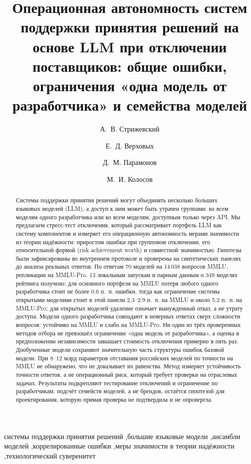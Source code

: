 \documentclass[preprint,12pt,authoryear]{elsarticle}
\begin{document}
\begin{frontmatter}

\title{Операционная автономность систем поддержки принятия решений на основе LLM при отключении поставщиков: общие ошибки, ограничения «одна модель от разработчика» и семейства моделей}

\author[bmstu]{А.~В. Стрижевский}
\author[bmstu]{Е.~Д. Верховых}
\author[bmstu]{Д.~М. Парамонов}
\author[bmstu]{М.~И. Колосов}

\begin{abstract}
Системы поддержки принятия решений могут объединять несколько больших языковых моделей (LLM), а доступ к ним может быть утрачен группами: ко всем моделям одного разработчика или ко всем моделям, доступным только через API. Мы предлагаем стресс-тест отключения, который рассматривает портфель LLM как систему компонентов и измеряет его операционную автономность мерами значимости из теории надёжности: приростом ошибки при групповом отключении, его относительной формой (risk achievement worth) и совместной значимостью. Гипотезы были зафиксированы во внутреннем протоколе и проверены на синтетических панелях до анализа реальных ответов. По ответам 70 моделей на 14\,038 вопросов MMLU, репликации на MMLU-Pro, 13 локальным запускам и парным данным о 349 моделях рейтинга получено: для основного портфеля на MMLU потеря любого одного разработчика стоит не более 0.6 п.~п. ошибки, тогда как ограничение системы открытыми моделями стоит в этой панели 2.3--2.9 п.~п. на MMLU и около 5.2 п.~п. на MMLU-Pro; для открытых моделей удаление означает вынужденный отказ, а не утрату доступа. Модели одного разработчика совпадают в неверных ответах сверх сложности вопросов: устойчиво на MMLU и слабо на MMLU-Pro. Ни один из трёх проверенных методов отбора не превзошёл ограничение «одна модель от разработчика», а оценка в предположении независимости завышает стоимость отключения примерно в пять раз. Дообученные модели сохраняют значительную часть структуры ошибок базовой модели. При 8--12 млрд параметров отставания российских моделей по точности на MMLU не обнаружено, что не доказывает их равенства. Метод измеряет устойчивость точности ответов, а не операционный риск, который требует проверки на отраслевых задачах. Результаты подкрепляют тестирование отключений и ограничение по разработчикам; подсчёт семейств моделей, а не брендов, остаётся гипотезой для проектирования, которую прямая проверка не подтвердила и не опровергла.
\end{abstract}

\begin{keyword}
системы поддержки принятия решений \sep большие языковые модели \sep ансамбли моделей \sep коррелированные ошибки \sep меры значимости в теории надёжности \sep технологический суверенитет
\end{keyword}

\end{frontmatter}
\end{document}
